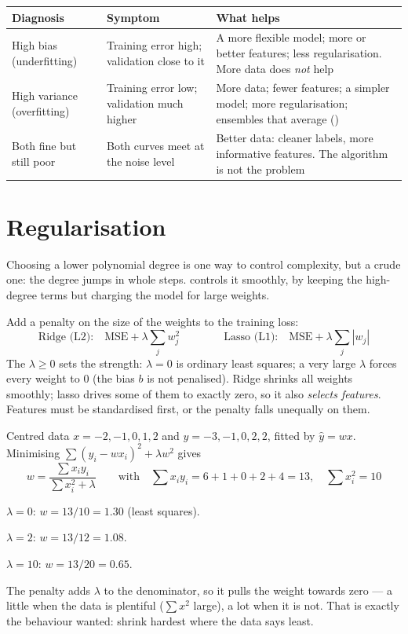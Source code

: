 \begin{longtable}{@{}L{3.0cm}L{4.4cm}L{7.6cm}@{}}
\toprule
{}
\textbf{Diagnosis} & \textbf{Symptom} & \textbf{What helps} \\
\midrule
\endhead
High bias (underfitting) & Training error high; validation close to it & A more
flexible model; more or better features; less regularisation. More data does
\emph{not} help \\
High variance (overfitting) & Training error low; validation much higher & More
data; fewer features; a simpler model; more regularisation; ensembles that
average () \\
Both fine but still poor & Both curves meet at the noise level & Better data:
cleaner labels, more informative features. The algorithm is not the problem \\
\bottomrule
\end{longtable}

\section{Regularisation}

Choosing a lower polynomial degree is one way to control complexity, but a crude
one: the degree jumps in whole steps.  controls it smoothly,
by keeping the high-degree terms but charging the model for large weights.

\begin{definitionbox}
Add a penalty on the size of the weights to the training loss:
\[
\text{Ridge (L2):}\quad \text{MSE} + \lambda\sum_{j} w_j^2
\qquad\qquad
\text{Lasso (L1):}\quad \text{MSE} + \lambda\sum_{j} |w_j|
\]
The  $\lambda \ge 0$ sets the strength: $\lambda = 0$ is
ordinary least squares; a very large $\lambda$ forces every weight to 0 (the bias
$b$ is not penalised). Ridge shrinks all weights smoothly; lasso drives some of
them to exactly zero, so it also \emph{selects features}. Features must be
standardised first, or the penalty falls unequally on them.
\end{definitionbox}

\begin{worked}
Centred data $x = -2, -1, 0, 1, 2$ and $y = -3, -1, 0, 2, 2$, fitted by $\hat{y} = wx$.
Minimising $\sum(y_i - wx_i)^2 + \lambda w^2$ gives
\[
w = \frac{\sum x_i y_i}{\sum x_i^2 + \lambda}
\qquad\text{with}\quad \textstyle\sum x_i y_i = 6 + 1 + 0 + 2 + 4 = 13,\quad \sum x_i^2 = 10
\]
\begin{tight}
  \item $\lambda = 0$: $w = 13/10 = \mathbf{1.30}$ (least squares).
  \item $\lambda = 2$: $w = 13/12 = \mathbf{1.08}$.
  \item $\lambda = 10$: $w = 13/20 = \mathbf{0.65}$.
\end{tight}
The penalty adds $\lambda$ to the denominator, so it pulls the weight towards zero
--- a little when the data is plentiful ($\sum x^2$ large), a lot when it is not.
That is exactly the behaviour wanted: shrink hardest where the data says least.
\end{worked}

